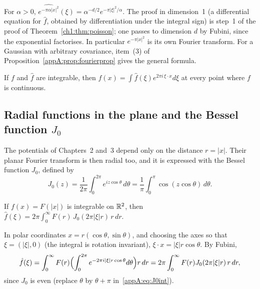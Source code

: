\begin{example}[Gaussians]\label{appA:ex:gauss}
For $\alpha>0$, $\widehat{e^{-\pi\alpha|x|^2}}(\xi)=\alpha^{-d/2}e^{-\pi|\xi|^2/\alpha}$. The proof in dimension~1
(a differential equation for $\hat f$, obtained by differentiation under the integral sign) is step~1 of the proof
of Theorem~\ref{ch1:thm:poisson}; one passes to dimension $d$ by Fubini, since the exponential factorises. In
particular $e^{-\pi|x|^2}$ is its own Fourier transform. For a Gaussian with arbitrary covariance,
item~(3) of Proposition~\ref{appA:prop:fourierprop} gives the general formula.
\end{example}

\begin{theorem}\label{appA:thm:inversion}
If $f$ and $\hat f$ are integrable, then $f(x)=\int\hat f(\xi)e^{2\pi i\,\xi\cdot x}d\xi$ at every point where $f$ is
continuous.
\end{theorem}

\subsection{Radial functions in the plane and the Bessel function \texorpdfstring{$J_0$}{J0}}\label{appA:ssec:hankel}

The potentials of Chapters~2 and~3 depend only on the distance $r=|x|$. Their planar Fourier transform is then
radial too, and it is expressed with the Bessel function $J_0$, defined by
\begin{equation}\label{appA:eq:J0int}
J_0(z)=\frac1{2\pi}\int_0^{2\pi}e^{iz\cos\theta}\,d\theta=\frac1\pi\int_0^\pi\cos(z\cos\theta)\,d\theta .
\end{equation}

\begin{proposition}\label{appA:prop:hankel}
If $f(x)=F(|x|)$ is integrable on $\mathbb{R}^2$, then $\hat f(\xi)=2\pi\int_0^\infty F(r)\,J_0(2\pi|\xi|r)\,r\,dr$.
\end{proposition}

\begin{humanproof}
In polar coordinates $x=r(\cos\theta,\sin\theta)$, and choosing the axes so that
$\xi=(|\xi|,0)$ (the integral is rotation invariant), $\xi\cdot x=|\xi|r\cos\theta$. By Fubini,
\[\hat f(\xi)=\int_0^\infty F(r)\Bigl(\int_0^{2\pi}e^{-2\pi i|\xi|r\cos\theta}d\theta\Bigr)r\,dr
=2\pi\int_0^\infty F(r)J_0(2\pi|\xi|r)\,r\,dr ,\]
since $J_0$ is even (replace $\theta$ by $\theta+\pi$ in~\eqref{appA:eq:J0int}).
\end{humanproof}

